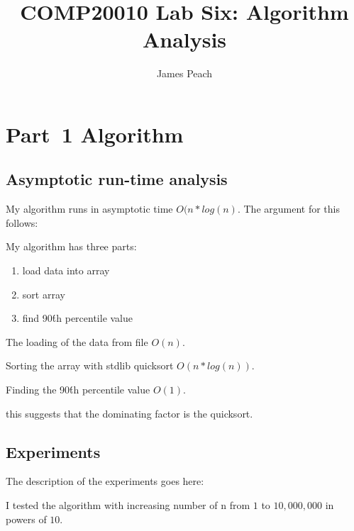 \documentclass{article}
\title{COMP20010 Lab Six: Algorithm Analysis}
\author{James Peach}
\begin{document}
\maketitle

\section{Part~1 Algorithm}
\label{sec:algorithm1}

\subsection{Asymptotic run-time analysis}

My algorithm runs in asymptotic time $O(n * log(n)$. The argument for this follows:

My algorithm has three parts:
\begin{enumerate}
	\item load data into array
	\item sort array
	\item find 90\'th percentile value
\end{enumerate}

The loading of the data from file $O(n)$.

Sorting the array with stdlib quicksort $O(n*log(n))$.

Finding the 90\'th percentile value $O(1)$.

this suggests that the dominating factor is the quicksort.

\subsection{Experiments}
\label{sec:experiments1}
The description of the experiments goes here: 

I tested the algorithm with increasing number of n from $1$ to $10,000,000$ 
in powers of $10$.

\end{document}
